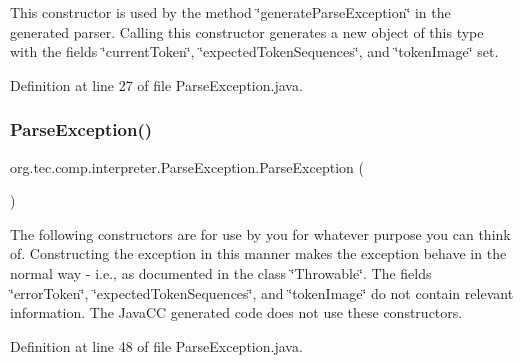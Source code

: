 This constructor is used by the method \char`\"{}generate\+Parse\+Exception\char`\"{} in the generated parser. Calling this constructor generates a new object of this type with the fields \char`\"{}current\+Token\char`\"{}, \char`\"{}expected\+Token\+Sequences\char`\"{}, and \char`\"{}token\+Image\char`\"{} set. 

Definition at line 27 of file Parse\+Exception.\+java.

\mbox{\label{classorg_1_1tec_1_1comp_1_1interpreter_1_1_parse_exception_a81773d0467bb91c84f4f221cba2222c6}} 
\subsubsection{\texorpdfstring{Parse\+Exception()}{ParseException()}\hspace{0.1cm}{\footnotesize\ttfamily [2/3]}}
{\footnotesize\ttfamily org.\+tec.\+comp.\+interpreter.\+Parse\+Exception.\+Parse\+Exception (\begin{DoxyParamCaption}{ }\end{DoxyParamCaption})\hspace{0.3cm}{\ttfamily [inline]}}

The following constructors are for use by you for whatever purpose you can think of. Constructing the exception in this manner makes the exception behave in the normal way -\/ i.\+e., as documented in the class \char`\"{}\+Throwable\char`\"{}. The fields \char`\"{}error\+Token\char`\"{}, \char`\"{}expected\+Token\+Sequences\char`\"{}, and \char`\"{}token\+Image\char`\"{} do not contain relevant information. The Java\+CC generated code does not use these constructors. 

Definition at line 48 of file Parse\+Exception.\+java.

\mbox{\label{classorg_1_1tec_1_1comp_1_1interpreter_1_1_parse_exception_ae1452449f018cf55d1f2865ea5cb4037}} 
